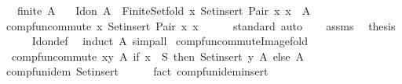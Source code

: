 \begin{isabellebody}
\ \ \ {\isachardoublequoteopen}finite\ A{\isachardoublequoteclose}\isanewline
\ \ \ {\isachardoublequoteopen}Id{\isacharunderscore}{\kern0pt}on\ A\ {\isacharequal}{\kern0pt}\ Finite{\isacharunderscore}{\kern0pt}Set{\isachardot}{\kern0pt}fold\ {\isacharparenleft}{\kern0pt}{\isasymlambda}x{\isachardot}{\kern0pt}\ Set{\isachardot}{\kern0pt}insert\ {\isacharparenleft}{\kern0pt}Pair\ x\ x{\isacharparenright}{\kern0pt}{\isacharparenright}{\kern0pt}\ {\isacharbraceleft}{\kern0pt}{\isacharbraceright}{\kern0pt}\ A{\isachardoublequoteclose}\isanewline
%
\isadelimproof
%
\endisadelimproof
%
\isatagproof
{}\isamarkupfalse%
\ {\isacharminus}{\kern0pt}\isanewline
\ \ \isamarkupfalse%
\ comp{\isacharunderscore}{\kern0pt}fun{\isacharunderscore}{\kern0pt}commute\ {\isachardoublequoteopen}{\isasymlambda}x{\isachardot}{\kern0pt}\ Set{\isachardot}{\kern0pt}insert\ {\isacharparenleft}{\kern0pt}Pair\ x\ x{\isacharparenright}{\kern0pt}{\isachardoublequoteclose}\isanewline
\ \ \ \ \isamarkupfalse%
\ standard\ auto\isanewline
\ \ \isamarkupfalse%
\ assms\ \isamarkupfalse%
\ {\isacharquery}{\kern0pt}thesis\isanewline
\ \ \ \ \isamarkupfalse%
\ Id{\isacharunderscore}{\kern0pt}on{\isacharunderscore}{\kern0pt}def\ \isamarkupfalse%
\ {\isacharparenleft}{\kern0pt}induct\ A{\isacharparenright}{\kern0pt}\ simp{\isacharunderscore}{\kern0pt}all\isanewline
{}\isamarkupfalse%
%
\endisatagproof
{\isafoldproof}%
%
\isadelimproof
\isanewline
%
\endisadelimproof
\isanewline
{}\isamarkupfalse%
\ comp{\isacharunderscore}{\kern0pt}fun{\isacharunderscore}{\kern0pt}commute{\isacharunderscore}{\kern0pt}Image{\isacharunderscore}{\kern0pt}fold{\isacharcolon}{\kern0pt}\isanewline
\ \ {\isachardoublequoteopen}comp{\isacharunderscore}{\kern0pt}fun{\isacharunderscore}{\kern0pt}commute\ {\isacharparenleft}{\kern0pt}{\isasymlambda}{\isacharparenleft}{\kern0pt}x{\isacharcomma}{\kern0pt}y{\isacharparenright}{\kern0pt}\ A{\isachardot}{\kern0pt}\ if\ x\ {\isasymin}\ S\ then\ Set{\isachardot}{\kern0pt}insert\ y\ A\ else\ A{\isacharparenright}{\kern0pt}{\isachardoublequoteclose}\isanewline
%
\isadelimproof
%
\endisadelimproof
%
\isatagproof
{}\isamarkupfalse%
\ {\isacharminus}{\kern0pt}\isanewline
\ \ \isamarkupfalse%
\ comp{\isacharunderscore}{\kern0pt}fun{\isacharunderscore}{\kern0pt}idem\ Set{\isachardot}{\kern0pt}insert\isanewline
\ \ \ \ \isamarkupfalse%
\ {\isacharparenleft}{\kern0pt}fact\ comp{\isacharunderscore}{\kern0pt}fun{\isacharunderscore}{\kern0pt}idem{\isacharunderscore}{\kern0pt}insert{\isacharparenright}{\kern0pt}\isanewline

\end{isabellebody}
